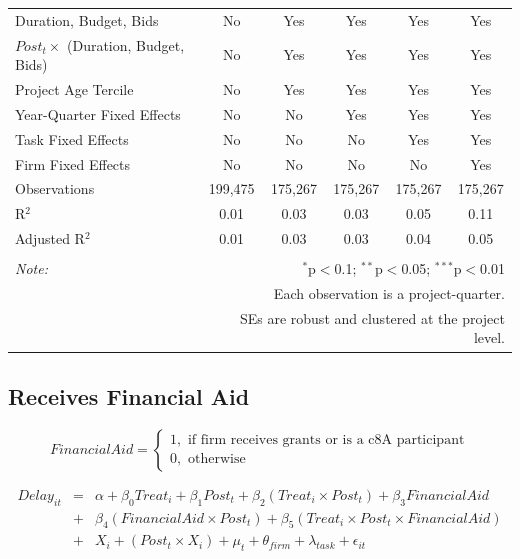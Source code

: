 \documentclass[]{article}
\begin{document}
\begin{table}[H]
\begin{tabular}{@{\extracolsep{-2pt}}lccccc}
Duration, Budget, Bids & No & Yes & Yes & Yes & Yes \\ 
$Post_t \times $  (Duration, Budget, Bids) & No & Yes & Yes & Yes & Yes \\ 
Project Age Tercile & No & Yes & Yes & Yes & Yes \\ 
Year-Quarter Fixed Effects & No & No & Yes & Yes & Yes \\ 
Task Fixed Effects & No & No & No & Yes & Yes \\ 
Firm Fixed Effects & No & No & No & No & Yes \\ 
Observations & 199,475 & 175,267 & 175,267 & 175,267 & 175,267 \\ 
R$^{2}$ & 0.01 & 0.03 & 0.03 & 0.05 & 0.11 \\ 
Adjusted R$^{2}$ & 0.01 & 0.03 & 0.03 & 0.04 & 0.05 \\ 
\hline 
\hline \\[-1.8ex] 
\textit{Note:}  & \multicolumn{5}{r}{$^{*}$p$<$0.1; $^{**}$p$<$0.05; $^{***}$p$<$0.01} \\ 
 & \multicolumn{5}{r}{Each observation is a project-quarter.} \\ 
 & \multicolumn{5}{r}{SEs are robust and clustered at the project level.} \\ 
\end{tabular} 
\end{table}

\hypertarget{receives-financial-aid}{%
\subsection{Receives Financial Aid}\label{receives-financial-aid}}

\[ FinancialAid = \begin{cases} 1, \text{ if firm receives grants or is a c8A participant}\\
0, \text{ otherwise} \end{cases}\]

\[ \begin{aligned}
Delay_{it} &=& \alpha+\beta_0 Treat_i + \beta_1 Post_t + \beta_2 (Treat_i \times Post_t) +\beta_3 FinancialAid \\
&+& \beta_4 (FinancialAid \times Post_t) + \beta_5 (Treat_i \times Post_t \times FinancialAid) \\ 
&+&X_i + (Post_t \times X_i) + \mu_t + \theta_{firm} + \lambda_{task}+ \epsilon_{it}
\end{aligned}\]
\end{document}
